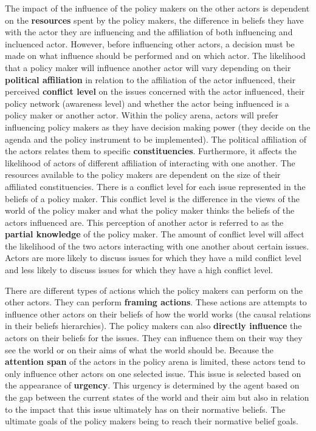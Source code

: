 \documentclass{article}
\begin{document}
The impact of the influence of the policy makers on the other actors is dependent on the {\bfseries resources} spent by the policy makers, the difference in beliefs they have with the actor they are influencing and the affiliation of both influencing and incluenced actor. However, before influencing other actors, a decision must be made on what influence should be performed and on which actor. The likelihood that a policy maker will influence another actor will vary depending on their {\bfseries political affiliation} in relation to the affiliation of the actor influenced, their perceived {\bfseries conflict level} on the issues concerned with the actor influenced, their policy network (awareness level) and whether the actor being influenced is a policy maker or another actor. Within the policy arena, actors will prefer influencing policy makers as they have decision making power (they decide on the agenda and the policy instrument to be implemented). The political affiliation of the actors relates them to specific {\bfseries constituencies}. Furthermore, it affects the likelihood of actors of different affiliation of interacting with one another. The resources available to the policy makers are dependent on the size of their affiliated constituencies. There is a conflict level for each issue represented in the beliefs of a policy maker. This conflict level is the difference in the views of the world of the policy maker and what the policy maker thinks the beliefs of the actors influenced are. This perception of another actor is referred to as the {\bfseries partial knowledge} of the policy maker. The amount of conflict level will affect the likelihood of the two actors interacting with one another about certain issues. Actors are more likely to discuss issues for which they have a mild conflict level and less likely to discuss issues for which they have a high conflict level.

There are different types of actions which the policy makers can perform on the other actors. They can perform {\bfseries framing actions}. These actions are attempts to influence other actors on their beliefs of how the world works (the causal relations in their beliefs hierarchies). The policy makers can also {\bfseries directly influence} the actors on their beliefs for the issues. They can influence them on their way they see the world or on their aims of what the world should be. Because the {\bfseries attention span} of the actors in the policy arena is limited, these actors tend to only influence other actors on one selected issue. This issue is selected based on the appearance of {\bfseries urgency}. This urgency is determined by the agent based on the gap between the current states of the world and their aim but also in relation to the impact that this issue ultimately has on their normative beliefs. The ultimate goals of the policy makers being to reach their normative belief goals. 
\end{document}
